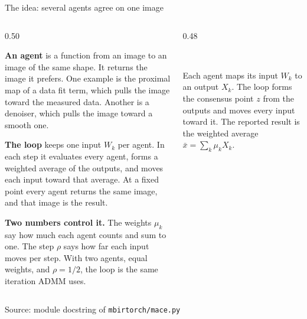 \documentclass[aspectratio=169,10pt]{beamer}
\newcommand{\tagchip}[2]{{\setlength{\fboxsep}{2.5pt}\setlength{\fboxrule}{0.6pt}%
  \fcolorbox{white}{#1}{\textcolor{white}{\footnotesize\bfseries\strut #2}}}}
\newcommand{\macechip}{\tagchip{planAccent}{MACE}}
\newcommand{\source}[1]{\par\vfill{\scriptsize\textcolor{inkGray}{Source: #1}\par}}
\newcommand{\figcaption}[1]{{\scriptsize\textcolor{inkGray}{#1}\par}}
\newcommand{\head}[1]{\textbf{#1}}
\begin{document}
\begin{frame}{The idea: several agents agree on one image \hfill \macechip}
  \begin{columns}[T]
    \begin{column}{0.50\textwidth}
      {\footnotesize
      \head{An agent} is a function from an image to an image of the same
      shape.  It returns the image it prefers.  One example is the proximal
      map of a data fit term, which pulls the image toward the measured
      data.  Another is a denoiser, which pulls the image toward a smooth
      one.\par\vspace{5pt}
      \head{The loop} keeps one input $W_k$ per agent.  In each step it
      evaluates every agent, forms a weighted average of the outputs, and
      moves each input toward that average.  At a fixed point every agent
      returns the same image, and that image is the result.\par\vspace{5pt}
      \head{Two numbers control it.}  The weights $\mu_k$ say how much each
      agent counts and sum to one.  The step $\rho$ says how far each input
      moves per step.  With two agents, equal weights, and $\rho = 1/2$,
      the loop is the same iteration ADMM uses.\par}
    \end{column}
    \begin{column}{0.48\textwidth}
      \centering
      \\[6pt]
      \figcaption{Each agent maps its input $W_k$ to an output $X_k$.  The
      loop forms the consensus point $z$ from the outputs and moves every
      input toward it.  The reported result is the weighted average
      $\bar{x} = \sum_k \mu_k X_k$.}
    \end{column}
  \end{columns}
  \source{module docstring of \texttt{mbirtorch/mace.py}}
\end{frame}
\end{document}
